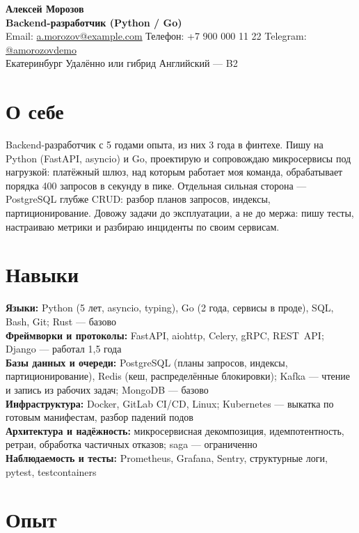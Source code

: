 \documentclass[a4paper,10pt]{article}
\makeatletter
\newcommand{\CICD}{\mbox{CI/CD}}
\newcommand{\RESTAPI}{\mbox{REST API}}
\newcommand{\CVName}{Алексей Морозов}
\newcommand{\CVTitle}{Backend-разработчик (Python / Go)}
\newcommand{\CVEmail}{a.morozov@example.com}
\newcommand{\CVPhone}{+7 900 000 11 22}
\newcommand{\CVTelegram}{amorozovdemo}
\makeatother
\begin{document}
{\LARGE \textbf{\CVName}}\\
\textbf{\CVTitle}\\
Email: \href{mailto:\CVEmail}{\CVEmail} \quad
Телефон: \CVPhone \quad
Telegram: \href{https://t.me/\CVTelegram}{@\CVTelegram}\\
Екатеринбург \quad Удалённо или гибрид \quad Английский --- B2

\section*{О себе}

Backend-разработчик с 5 годами опыта, из них 3 года в финтехе. Пишу на Python
(FastAPI, asyncio) и Go, проектирую и сопровождаю микросервисы под нагрузкой:
платёжный шлюз, над которым работает моя команда, обрабатывает порядка 400 запросов
в секунду в пике. Отдельная сильная сторона --- PostgreSQL глубже CRUD: разбор планов
запросов, индексы, партиционирование. Довожу задачи до эксплуатации, а не до мержа:
пишу тесты, настраиваю метрики и разбираю инциденты по своим сервисам.

\section*{Навыки}

\textbf{Языки:} Python (5 лет, asyncio, typing), Go (2 года, сервисы в проде), SQL,
Bash, Git; Rust --- базово\\
\textbf{Фреймворки и протоколы:} FastAPI, aiohttp, Celery, gRPC, \RESTAPI{};
Django --- работал 1,5 года\\
\textbf{Базы данных и очереди:} PostgreSQL (планы запросов, индексы,
партиционирование), Redis (кеш, распределённые блокировки); Kafka --- чтение и
запись из рабочих задач; MongoDB --- базово\\
\textbf{Инфраструктура:} Docker, GitLab \CICD{}, Linux; Kubernetes --- выкатка по
готовым манифестам, разбор падений подов\\
\textbf{Архитектура и надёжность:} микросервисная декомпозиция, идемпотентность,
ретраи, обработка частичных отказов; saga --- ограниченно\\
\textbf{Наблюдаемость и тесты:} Prometheus, Grafana, Sentry, структурные логи,
pytest, testcontainers

\section*{Опыт}
\end{document}
